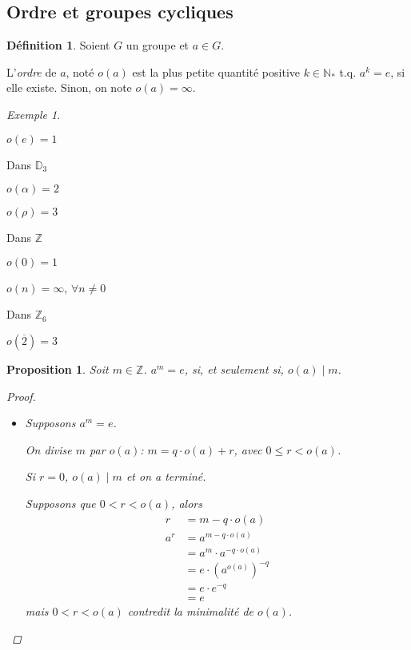 \documentclass{report}
\newcommand*{\lte}{\leqslant}
\newcommand*{\entiers}{\mathbb{Z}}
\newcommand*{\naturels}{\mathbb{N}}
\newtheorem*{prop}{Proposition}
\theoremstyle{definition}
\newtheorem*{defin}{D\'efinition}
\theoremstyle{remark}
\newtheorem*{exem}{Exemple}
\begin{document}
	\subsection{Ordre et groupes cycliques}
	\begin{defin}
		Soient $G$ un groupe et $a \in G$.

		L'\emph{ordre} de $a$, not\'e $o(a)$ est la plus petite quantit\'e positive $k \in \naturels_*$ t.q. $a^k=e$, si elle existe. Sinon, on note $o(a) = \infty$.
	\end{defin}
	\begin{exem}~

		\begin{ulist}
			\item $o(e)=1$
			\item Dans $\mathbb{D}_3$
			\begin{ulist}
				\item $o(\alpha) = 2$
				\item $o(\rho) = 3$
			\end{ulist}
			\item Dans $\entiers$
			\begin{ulist}
				\item $o(0) = 1$
				\item $o(n) = \infty$, $\forall n\neq0$
			\end{ulist}
			\item Dans $\entiers_6$
			\begin{ulist}
				\item $o(\overline2) = 3$
			\end{ulist}
		\end{ulist}
	\end{exem}
	\begin{prop}
		Soit $m \in \entiers$. $a^m = e$, si, et seulement si, $o(a) \mid m$.
		\begin{proof}~

			\begin{itemize}
				\item[$(\Rightarrow)$] Supposons $a^m=e$.

				On divise $m$ par $o(a)$: $m = q \cdot o(a) + r$, avec $0 \lte r < o(a)$.

				Si $r=0$, $o(a) \mid m$ et on a termin\'e.

				Supposons que $0<r<o(a)$, alors
				\begin{align*}
					r&= m-q \cdot o(a)\\
					a^r&= a^{m-q \cdot o(a)}\\
					&= a^m \cdot a^{-q \cdot o(a)}\\
					&= e \cdot (a^{o(a)})^{-q}\\
					&= e \cdot e^{-q}\\
					&= e
				\end{align*}
				mais $0<r<o(a)$ contredit la minimalit\'e de $o(a)$.
			\end{itemize}
		\end{proof}
	\end{prop}
\end{document}
